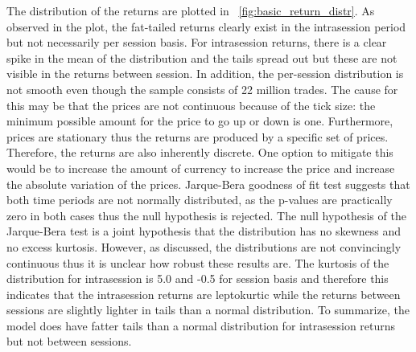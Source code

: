 The distribution of the returns are plotted in ~\ref{fig:basic_return_distr}. As observed in the plot, the fat-tailed returns
clearly exist in the intrasession period but not necessarily per session basis. For intrasession returns, there is a clear spike in the mean of the 
distribution and the tails spread out but these are not visible in the returns between session. In addition, the per-session distribution
is not smooth even though the sample consists of 22 million trades. The cause for this may be that the prices are not 
continuous because of the tick size: the minimum possible amount for the price to go up or down is one. Furthermore, prices are
stationary thus the returns are produced by a specific set of prices. Therefore, the returns are also inherently discrete. One option
to mitigate this would be to increase the amount of currency to increase the price and increase the absolute
variation of the prices. Jarque-Bera goodness of fit test suggests that both time periods are not normally distributed, %
as the p-values are practically zero in both cases thus the null hypothesis is rejected. The null hypothesis of the Jarque-Bera test 
is a joint hypothesis that the distribution has no skewness and no excess kurtosis. However, as discussed, the distributions are not 
convincingly continuous thus it is unclear how robust these results are. The kurtosis of the distribution for intrasession is 5.0 
and -0.5 for session basis and therefore this indicates that the intrasession returns are leptokurtic while the returns between 
sessions are slightly lighter in tails than a normal distribution. To summarize, the model does have fatter tails than a normal distribution
for intrasession returns but not between sessions. 


